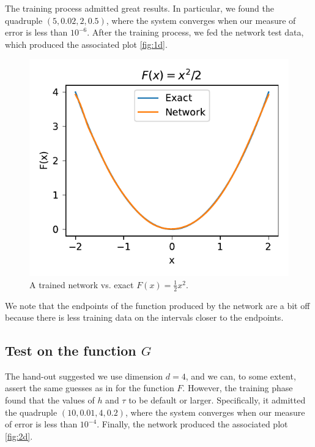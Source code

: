 \documentclass{article}
\begin{document}
The training process admitted great results. In particular, we found the quadruple $(5, 0.02, 2, 0.5)$, where the system converges when our measure of error is less than $10^{-6}$. After the training process, we fed the network test data, which produced the associated plot \autoref{fig:1d}.

\begin{figure}[h!]
    \centering
    \includegraphics[width=.55\linewidth, trim={0 .2cm 0 .2cm}, clip]{1d.pdf}
    \caption{A trained network vs. exact $F(x)=\frac{1}{2}x^2$.}
    \label{fig:1d}
\end{figure}

We note that the endpoints of the function produced by the network are a bit off because there is less training data on the intervals closer to the endpoints.

\subsection{Test on the function $G$}
The hand-out suggested we use dimension $d=4$, and we can, to some extent, assert the same guesses as in for the function $F$. However, the training phase found that the values of $h$ and $\tau$ to be default or larger. Specifically, it admitted the quadruple $(10, 0.01, 4, 0.2)$, where the system converges when our measure of error is less than $10^{-4}$. Finally, the network produced the associated plot \autoref{fig:2d}.
\end{document}
